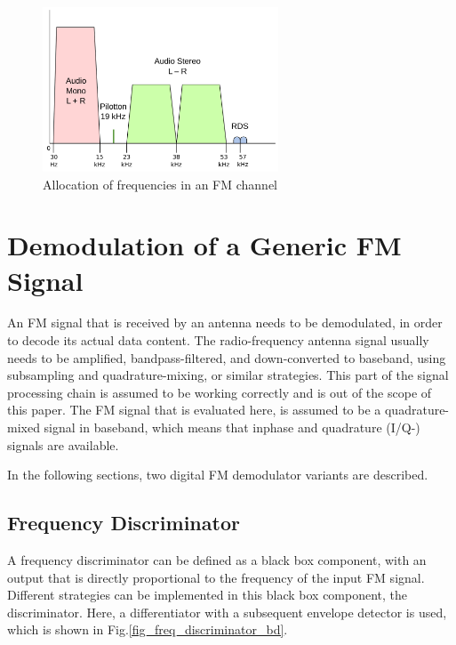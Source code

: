 \documentclass[conference]{IEEEtran}
\begin{document}
    \begin{figure}[!h]
      \centering
        \includegraphics[width=7cm]{img/fm-channel-baseband.png}
      \caption{Allocation of frequencies in an FM channel \cite{ref_fig_channel_freqs}}
      \label{fig_channel_baseband_freqs}
    \end{figure}


\section{Demodulation of a Generic FM Signal}
\label{sec_fm_sig_demod}
  An FM signal that is received by an antenna needs to be demodulated, in order to decode its actual data content.
  The radio-frequency antenna signal usually needs to be amplified, bandpass-filtered, and down-converted to baseband, using subsampling and quadrature-mixing, or similar strategies.
  This part of the signal processing chain is assumed to be working correctly and is out of the scope of this paper.
  The FM signal that is evaluated here, is assumed to be a quadrature-mixed signal in baseband, which means that inphase and quadrature (I/Q-) signals are available.


  In the following sections, two digital FM demodulator variants are described.

  \subsection{Frequency Discriminator}
    A frequency discriminator can be defined as a black box component, with an output that is directly proportional to the frequency of the input FM signal.
    Different strategies can be implemented in this black box component, the discriminator.
    Here, a differentiator with a subsequent envelope detector is used, which is shown in Fig.\ref{fig_freq_discriminator_bd}.
\end{document}

